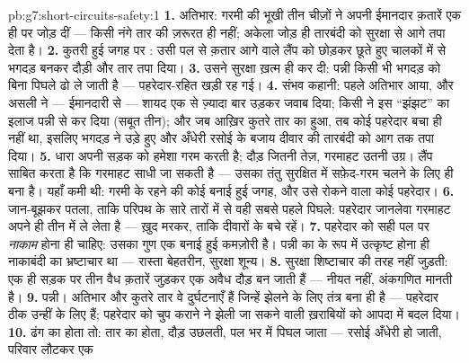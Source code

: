 \begin{solution}{pb:g7:short-circuits-safety:1}
\textbf{1.} अतिभार: गरमी की भूखी तीन चीज़ों ने अपनी ईमानदार क़तारें एक
ही  पर जोड़ दीं --- किसी नंगे तार की ज़रूरत ही नहीं; अकेला जोड़ ही
तारबंदी को सुरक्षा से आगे तपा देता है।
\textbf{2.} कुतरी हुई जगह पर : उसी पल से क़तार आगे वाले लैंप को
छोड़कर छूते हुए चालकों में से भगदड़ बनकर दौड़ी और तार तपा दिया।
\textbf{3.} उसने सुरक्षा ख़त्म ही कर दी: पन्नी किसी भी भगदड़ को बिना
पिघले ढो ले जाती है ---  पहरेदार-रहित खड़ी रह गई।
\textbf{4.} संभव कहानी: पहले अतिभार आया, और असली  ने ---
ईमानदारी से --- शायद एक से ज़्यादा बार उड़कर जवाब दिया; किसी ने इस
``झंझट'' का इलाज पन्नी से कर दिया (सबूत तीन); और जब आख़िर कुतरे तार का
 हुआ, तब कोई पहरेदार बचा ही नहीं था, इसलिए भगदड़ ने उड़े हुए
 और अँधेरी रसोई के बजाय दीवार की तारबंदी को आग तक तपा दिया।
\textbf{5.} धारा अपनी सड़क को हमेशा गरम करती है; दौड़ जितनी तेज़,
गरमाहट उतनी उग्र। लैंप साबित करता है कि गरमाहट साधी जा सकती है ---
उसका तंतु सुरक्षित  में सफ़ेद-गरम चलने के लिए ही बना है। यहाँ कमी
थी: गरमी के रहने की कोई बनाई हुई जगह, और उसे रोकने वाला कोई पहरेदार।
\textbf{6.} जान-बूझकर पतला, ताकि परिपथ के सारे तारों में से वही सबसे
पहले पिघले: पहरेदार जानलेवा गरमाहट अपने ही तीन  में ले लेता
है --- ख़ुद मरकर, ताकि दीवारों के  बचे रहें।
\textbf{7.} पहरेदार को सही पल पर \emph{नाकाम} होना ही चाहिए: उसका गुण
एक बनाई हुई कमज़ोरी है। पन्नी का  के रूप में उत्कृष्ट होना ही
नाकाबंदी का भ्रष्टाचार था --- रास्ता बेहतरीन, सुरक्षा शून्य।
\textbf{8.} सुरक्षा शिष्टाचार की तरह नहीं जुड़ती: एक ही सड़क पर तीन
वैध क़तारें जुड़कर एक अवैध दौड़ बन जाती हैं ---  नीयत नहीं,
अंकगणित मानती है।
\textbf{9.} पन्नी। अतिभार और कुतरे तार वे दुर्घटनाएँ हैं जिन्हें
झेलने के लिए तंत्र बना ही है --- पहरेदार ठीक उन्हीं के लिए हैं; पहरेदार
को चुप कराने ने झेली जा सकने वाली ख़राबियों को आपदा में बदल दिया।
\textbf{10.} ढंग का  होता तो: तार का  होता, दौड़ उछलती,
 पल भर में पिघल जाता --- रसोई अँधेरी हो जाती, परिवार लौटकर एक

\end{solution}
